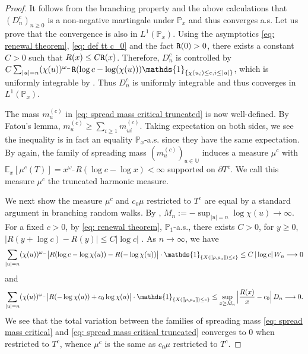 \documentclass[12pt]{article}
\def\llbracket{[\hspace{-.10em} [ }
\def\rrbracket{ ] \hspace{-.10em}]}
\numberwithin{equation}{section}
\theoremstyle{plain}
\theoremstyle{definition}
\begin{document}
\begin{proof}
It follows from the branching property and the above calculations that $(D^c_n)_{n\geq 0}$ is a non-negative martingale under $\mathbb{P}_x$ and thus converges a.s. Let us prove that the convergence is also in $L^1(\mathbb{P}_x)$. Using the asymptotics \eqref{eq: renewal theorem}, \eqref{eq: def tt c_0} and the fact ${\tt R}(0) > 0$, there exists a constant $C>0$ such that $R(x) \leq C{\tt R}(x)$. Therefore, $D^c_n$ is controlled by $C \sum_{|u| = n} (\chi(u))^{\omega_-} {\tt R}(\log c -\log(\chi(u)))\mathds{1}_{\{\chi(u_i)\leq c, i\leq |u|\}}$, which is uniformly integrable by \cite[Lemma 5.5]{ShiZhan2016BRWE}. Thus $D^c_n$ is uniformly integrable and thus converges in  $L^1(\mathbb{P}_x)$.

The mass $m^{(c)}_u$ in \eqref{eq: spread mass critical truncated} is now well-defined. By Fatou's lemma, $m^{(c)}_u\geq \sum_{i\geq 1} m^{(c)}_{ui}$. Taking expectation on both sides, we see the inequality is in fact an equality $\mathbb{P}_x$-a.s. since they have the same expectation. By \cite[Section 1.3]{BertoinJean2024SMta} again, the family of spreading mass $(m^{(c)}_u)_{u\in\mathbb{U}}$ induces a measure $\mu^c$ with $\mathbb{E}_x[\mu^c(T)]= x^{\omega_-}R(\log c - \log x) < \infty$ supported on $\partial T^c$. We call this measure $\mu^c$ the truncated harmonic measure.

We next show the measure $\mu^c$ and $c_0\mu$ restricted to $T^c$ are equal by a standard argument in branching random walks. By \cite[Lemma 3.1]{ShiZhan2016BRWE},  $M_n:=-\sup_{|u|=n}\log\chi(u)\to\infty$. For a fixed $c>0$, by \eqref{eq: renewal theorem}, $\mathbb{P}_1$-a.s., there exists $C>0$, for $y\geq 0$, $|R(y + \log c) - R(y)|\leq C|\log c|$ . As $n\to\infty$, we have
\begin{align*}
\sum_{|u|=n}(\chi(u))^{\omega_-}
\big|R(\log c-\log\chi(u))-R(-\log\chi(u))\big|\cdot
\mathds{1}_{\{X(\llbracket \rho,\rho_u \rrbracket)\le c\}}
\le C\,|\log c|\,W_n \longrightarrow 0
\end{align*}
and
\begin{align*}
\sum_{|u|=n}(\chi(u))^{\omega_-}
\big|R(-\log\chi(u))+c_0\log\chi(u)\big|
\cdot
\mathds{1}_{\{X(\llbracket \rho,\rho_u \rrbracket)\le c\}}
\le \sup_{x\ge M_n}
\Big|\frac{R(x)}{x}-c_0\Big|\, D_n
\longrightarrow 0.
\end{align*}
We see that the total variation between the families of spreading mass \eqref{eq: spread mass critical} and \eqref{eq: spread mass critical truncated} converges to $0$ when restricted to $T^c$, whence $\mu^c$ is the same as $c_0\mu$ restricted to $T^c$.

\end{proof}
\end{document}
